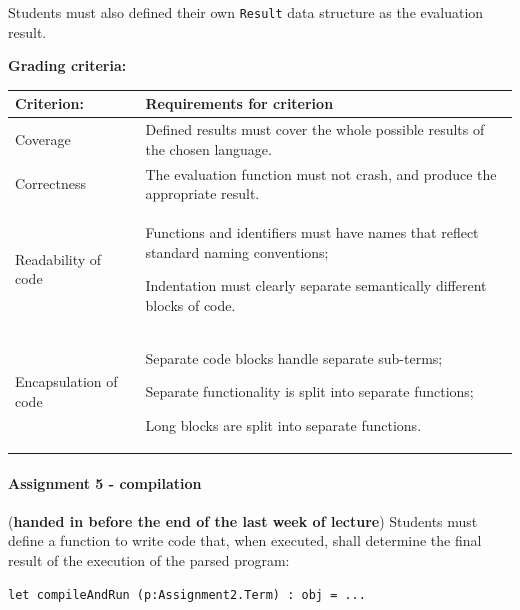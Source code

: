 \documentclass[a4paper, 10pt]{article}
\begin{document}
			Students must also defined their own \texttt{Result} data structure as the evaluation result.

			\textbf{Grading criteria:} \\			
				\begin{tabularx}{\textwidth}{|>{\columncolor{lichtGrijs}} X | p{}|}
					\hline
					\textbf{Criterion:} & \textbf{Requirements for criterion} \\
					\hline
					Coverage & Defined results must cover the whole possible results of the chosen language. \\
					\hline
					Correctness & The evaluation function must not crash, and produce the appropriate result. \\
					\hline
					Readability of code & 
						\begin{inparaenum}
							\item Functions and identifiers must have names that reflect standard naming conventions;
							\item Indentation must clearly separate semantically different blocks of code.
						\end{inparaenum} \\
					\hline
					Encapsulation of code & 
						\begin{inparaenum}
							\item Separate code blocks handle separate sub-terms;
							\item Separate functionality is split into separate functions;
							\item Long blocks are split into separate functions.
						\end{inparaenum} \\
					\hline
				\end{tabularx}			
			
		\paragraph*{Assignment 5 - compilation} (\textbf{handed in before the end of the last week of lecture})
			Students must define a function to write code that, when executed, shall determine the final result of the execution of the parsed program:
						
			\begin{lstlisting}
let compileAndRun (p:Assignment2.Term) : obj = ...
			\end{lstlisting}
\end{document}
